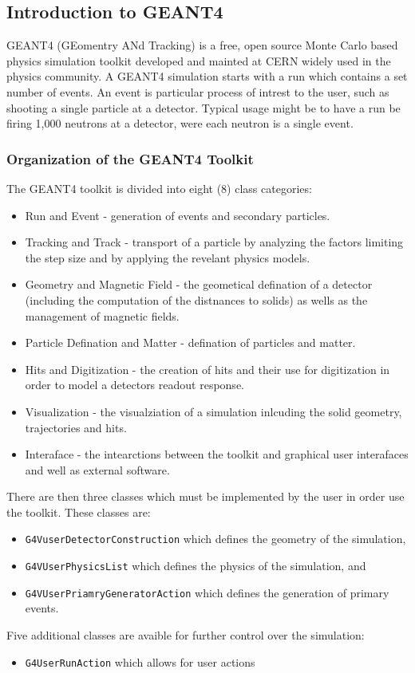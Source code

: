 \subsection{Introduction to GEANT4}

GEANT4 (GEomentry ANd Tracking) is a free, open source Monte Carlo based physics simulation toolkit developed and mainted at CERN widely used in the physics community.
A GEANT4 simulation starts with a run which contains a set number of events.
An event is particular process of intrest to the user, such as shooting a single particle at a detector. 
Typical usage might be to have a run be firing 1,000 neutrons at a detector, were each neutron is a single event.


\subsubsection{Organization of the GEANT4 Toolkit}
The GEANT4 toolkit is divided into eight (8) class categories:
\begin{itemize}
    \item Run and Event - generation of events and secondary particles.
    \item Tracking and Track - transport of a particle by analyzing the factors limiting the step size and by applying the revelant physics models.
    \item Geometry and Magnetic Field - the geometical defination of a detector (including the computation of the distnances to solids) as wells as the management of magnetic fields.
    \item Particle Defination and Matter - defination of particles and matter.
    \item Hits and Digitization - the creation of hits and their use for digitization in order to model a detectors readout response.
    \item Visualization - the visualziation of a simulation inlcuding the solid geometry, trajectories and hits.
    \item Interaface - the intearctions between the toolkit and graphical user interafaces and well as external software.
\end{itemize}

There are then three classes which must be implemented by the user in order use the toolkit. These classes are:
\begin{itemize}
    \item \verb+G4VuserDetectorConstruction+ which defines the geometry of the simulation,
    \item \verb+G4VUserPhysicsList+ which defines the physics of the simulation, and
    \item \verb+G4VUserPriamryGeneratorAction+ which defines the generation of primary events.
\end{itemize}
Five additional classes are avaible for further control over the simulation:
\begin{itemize}
    \item \verb+G4UserRunAction+ which allows for user actions
\end{itemize}
